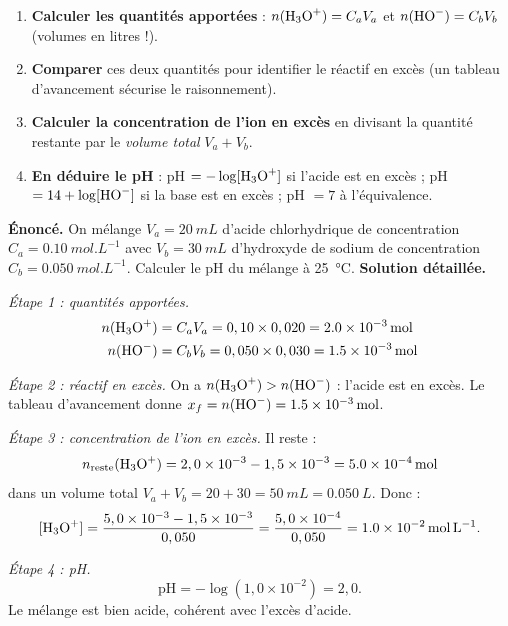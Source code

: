 \documentclass[11pt]{article}
\begin{document}
\begin{methode}
\begin{enumerate}
\item \textbf{Calculer les quantités apportées} : $n(\ce{H3O+}) = C_a V_a$ et $n(\ce{HO-}) = C_b V_b$ (volumes en litres !).
\item \textbf{Comparer} ces deux quantités pour identifier le réactif en excès (un tableau d'avancement sécurise le raisonnement).
\item \textbf{Calculer la concentration de l'ion en excès} en divisant la quantité restante par le \emph{volume total} $V_a + V_b$.
\item \textbf{En déduire le pH} : pH $= -\log[\ce{H3O+}]$ si l'acide est en excès ; pH $= 14 + \log[\ce{HO-}]$ si la base est en excès ; pH $= 7$ à l'équivalence.
\end{enumerate}
\end{methode}

\begin{exoresolu}
\textbf{Énoncé.} On mélange $V_a = \SI{20}{mL}$ d'acide chlorhydrique de concentration $C_a = \SI{0,10}{mol.L^{-1}}$ avec $V_b = \SI{30}{mL}$ d'hydroxyde de sodium de concentration $C_b = \SI{0,050}{mol.L^{-1}}$. Calculer le pH du mélange à \SI{25}{\celsius}.
\tcblower
\textbf{Solution détaillée.}

\emph{Étape 1 : quantités apportées.}
\begin{align*}
n(\ce{H3O+}) &= C_a V_a = 0,10 \times 0,020 = \SI{2,0e-3}{mol} \\
n(\ce{HO-}) &= C_b V_b = 0,050 \times 0,030 = \SI{1,5e-3}{mol}
\end{align*}

\emph{Étape 2 : réactif en excès.} On a $n(\ce{H3O+}) > n(\ce{HO-})$ : l'acide est en excès. Le tableau d'avancement donne $x_f = n(\ce{HO-}) = \SI{1,5e-3}{mol}$.

\emph{Étape 3 : concentration de l'ion en excès.} Il reste :
\[ n_{\text{reste}}(\ce{H3O+}) = 2,0\times 10^{-3} - 1,5\times 10^{-3} = \SI{5,0e-4}{mol} \]
dans un volume total $V_a + V_b = 20 + 30 = \SI{50}{mL} = \SI{0,050}{L}$. Donc :
\[ [\ce{H3O+}] = \frac{5,0\times 10^{-3} - 1,5\times 10^{-3}}{0,050} = \frac{5,0\times 10^{-4}}{0,050} = \SI{1,0e-2}{mol.L^{-1}}. \]

\emph{Étape 4 : pH.}
\[ \mathrm{pH} = -\log(1,0\times 10^{-2}) = 2,0. \]
Le mélange est bien acide, cohérent avec l'excès d'acide.
\end{exoresolu}
\end{document}
